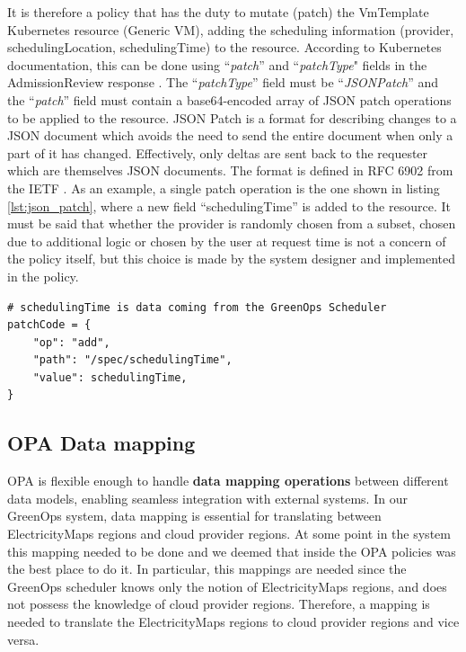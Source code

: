 It is therefore a policy that has the duty to mutate (patch) the VmTemplate Kubernetes resource (Generic VM), adding the scheduling information (provider, schedulingLocation, schedulingTime) to the resource.
According to Kubernetes documentation, this can be done using ``\textit{patch}'' and ``\textit{patchType}" fields in the AdmissionReview response \cite{kubernetes_dynamic_admission_control}.
The ``\textit{patchType}'' field must be ``\textit{JSONPatch}'' and the ``\textit{patch}'' field must contain a base64-encoded array of JSON patch operations to be applied to the resource.
JSON Patch is a format for describing changes to a JSON document which avoids the need to send the entire document when only a part of it has changed. 
Effectively, only deltas are sent back to the requester which are themselves JSON documents.
The format is defined in RFC 6902 from the IETF \cite{json_patch}.
As an example, a single patch operation is the one shown in listing \ref{lst:json_patch}, where a new field ``schedulingTime'' is added to the resource.
It must be said that whether the provider is randomly chosen from a subset, chosen due to additional logic or chosen by the user at request time is not a concern of the policy itself, but this choice is made by the system designer and implemented in the policy.

\begin{lstlisting}[language=rego, caption={JSON Patch example}, label={lst:json_patch}]
# schedulingTime is data coming from the GreenOps Scheduler
patchCode = {
	"op": "add",
	"path": "/spec/schedulingTime",
	"value": schedulingTime,
}
\end{lstlisting}

\subsection{OPA Data mapping}
\label{sec:opa_data_mapping}

OPA is flexible enough to handle \textbf{data mapping operations} between different data models, enabling seamless integration with external systems. 
In our GreenOps system, data mapping is essential for translating between ElectricityMaps regions and cloud provider regions. 
At some point in the system this mapping needed to be done and we deemed that inside the OPA policies was the best place to
do it.
In particular, this mappings are needed since the GreenOps scheduler knows only the notion of ElectricityMaps regions, and does not possess the knowledge of cloud provider regions. 
Therefore, a mapping is needed to translate the ElectricityMaps regions to cloud provider regions and vice versa.

